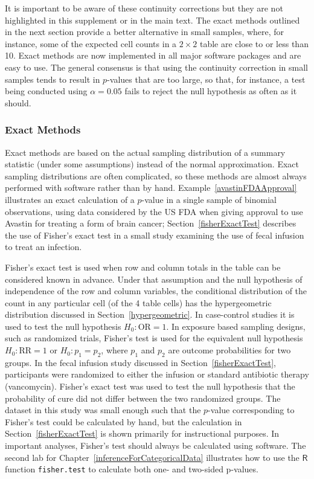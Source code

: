 It is important to be aware of these continuity corrections but they are not highlighted in this supplement or in the main text. The exact methods outlined in the next section provide a better alternative in small samples, where, for instance, some of the expected cell counts in a $2 \times 2$ table are close to or less than 10.  Exact methods are now implemented in all major software packages and are easy to use.   The general consensus is that using the continuity correction in small samples tends to result in $p$-values that are too large, so that, for instance, a test being conducted using $\alpha = 0.05$ fails to reject the null hypothesis as often as it should.

\subsubsection{Exact Methods}

Exact methods are based on the actual sampling distribution of a summary statistic (under some assumptions) instead of the normal approximation.  Exact sampling distributions are often complicated, so these methods are almost always performed with software rather than by hand. Example~\ref{avastinFDAApproval} illustrates an exact calculation of a $p$-value in a single sample of binomial observations, using data considered by the US FDA when giving approval to use Avastin for treating a form of brain cancer; Section~\ref{fisherExactTest} describes the use of Fisher's exact test in a small study examining the use of fecal infusion to treat an infection.


Fisher's exact test is used when row and column totals in the table can be considered known in advance.  Under that assumption and the null hypothesis of independence of the row and column variables, the conditional distribution of the count in any particular cell (of the 4 table cells) has the hypergeometric distribution discussed in Section~\ref{hypergeometric}. In case-control studies it is used to test the null hypothesis $H_0: \text{OR} = 1$.    In exposure based sampling designs, such as randomized trials, Fisher's test is used for the equivalent null hypothesis $H_0: \text{RR} = 1$ or $H_0: p_1 = p_2$, where $p_1$ and $p_2$ are outcome probabilities for two groups. In the fecal infusion study discussed in Section~\ref{fisherExactTest}, participants were randomized to either the infusion or standard antibiotic therapy (vancomycin). Fisher's exact test was used to test the null hypothesis that the probability of cure did not differ between the two randomized groups.  The dataset in this study was small enough such that the $p$-value corresponding to Fisher's test could be calculated by hand, but the calculation in Section~\ref{fisherExactTest} is shown primarily for instructional purposes. In important analyses, Fisher's test should always be calculated using software.  The second lab for Chapter~\ref{inferenceForCategoricalData} illustrates how to use the $\textsf{R}$ function \texttt{fisher.test} to calculate both one- and two-sided p-values.

